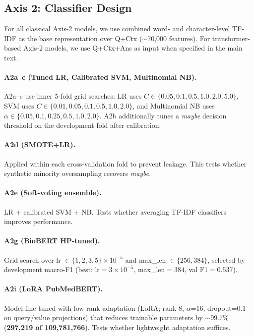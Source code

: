 \documentclass[11pt]{article}
\begin{document}
\subsection{Axis 2: Classifier Design}
\label{sec:axis2}

For all classical Axis-2 models, we use combined word- and character-level TF-IDF as the base representation over Q+Ctx ($\sim$70{,}000 features). For transformer-based Axis-2 models, we use Q+Ctx+Ans as input when specified in the main text.

\paragraph{A2a--c (Tuned LR, Calibrated SVM, Multinomial NB).} A2a--c use inner 5-fold grid searches: LR uses $C \in \{0.05, 0.1, 0.5, 1.0, 2.0, 5.0\}$, SVM uses $C \in \{0.01, 0.05, 0.1, 0.5, 1.0, 2.0\}$, and Multinomial NB uses $\alpha \in \{0.05, 0.1, 0.25, 0.5, 1.0, 2.0\}$. A2b additionally tunes a \textit{maybe} decision threshold on the development fold after calibration.

\paragraph{A2d (SMOTE+LR).} Applied within each cross-validation fold to prevent leakage. This tests whether synthetic minority oversampling recovers \textit{maybe}.

\paragraph{A2e (Soft-voting ensemble).} LR + calibrated SVM + NB. Tests whether averaging TF-IDF classifiers improves performance.

\paragraph{A2g (BioBERT HP-tuned).} Grid search over lr $\in \{1,2,3,5\}{\times}10^{-5}$ and max\_len $\in \{256,384\}$, selected by development macro-F1 (best: lr$={}3{\times}10^{-5}$, max\_len${}={}384$, val F1${}={}0.537$).

\paragraph{A2i (LoRA PubMedBERT).} Model fine-tuned with low-rank adaptation (LoRA; rank 8, $\alpha$=16, dropout=0.1 on query/value projections) that reduces trainable parameters by ${\sim}99.7\%$ (\textbf{297{,}219 of 109{,}781{,}766}). Tests whether lightweight adaptation suffices.
\end{document}
